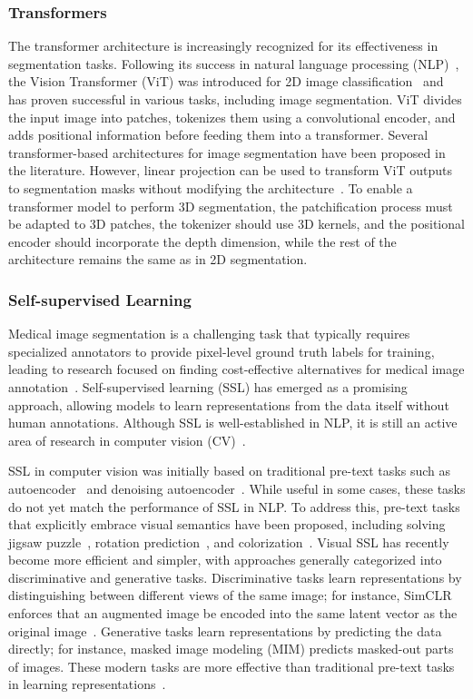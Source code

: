 \documentclass[a4paper,11pt,oneside]{report}
\begin{document}
\subsubsection{Transformers}
The transformer architecture is increasingly recognized for its effectiveness in segmentation tasks. Following its success in natural language processing (NLP)~\cite{Vaswani2017}, the Vision Transformer (ViT) was introduced for 2D image classification~\cite{Dosovitskiy2020vit} and has proven successful in various tasks, including image segmentation. ViT divides the input image into patches, tokenizes them using a convolutional encoder, and adds positional information before feeding them into a transformer. Several transformer-based architectures for image segmentation have been proposed in the literature. However, linear projection can be used to transform ViT outputs to segmentation masks without modifying the architecture~\cite{Oquab2024dinov, Ranzinger2024RADIO}. To enable a transformer model to perform 3D segmentation, the patchification process must be adapted to 3D patches, the tokenizer should use 3D kernels, and the positional encoder should incorporate the depth dimension, while the rest of the architecture remains the same as in 2D segmentation.

\subsubsection{Self-supervised Learning}
Medical image segmentation is a challenging task that typically requires specialized annotators to provide pixel-level ground truth labels for training, leading to research focused on finding cost-effective alternatives for medical image annotation~\cite{Fu2012, Gal2017, Beluch2018, Rahimi2021}. Self-supervised learning (SSL) has emerged as a promising approach, allowing models to learn representations from the data itself without human annotations. Although SSL is well-established in NLP, it is still an active area of research in computer vision (CV)~\cite{Balestriero2023}. 

SSL in computer vision was initially based on traditional pre-text tasks such as autoencoder~\cite{Hinton2006} and denoising autoencoder~\cite{Vincent2008}. While useful in some cases, these tasks do not yet match the performance of SSL in NLP. To address this, pre-text tasks that explicitly embrace visual semantics have been proposed, including solving jigsaw puzzle~\cite{Noroozi2016}, rotation prediction~\cite{Gidaris2018}, and colorization~\cite{Larsson2017}. Visual SSL has recently become more efficient and simpler, with approaches generally categorized into discriminative and generative tasks. Discriminative tasks learn representations by distinguishing between different views of the same image; for instance, SimCLR enforces that an augmented image be encoded into the same latent vector as the original image~\cite{Chen2020Simple}. Generative tasks learn representations by predicting the data directly; for instance, masked image modeling (MIM) predicts masked-out parts of images. These modern tasks are more effective than traditional pre-text tasks in learning representations~\cite{Chen2020Simple, He2020, He2022, Bao2022beit}.
\end{document}
